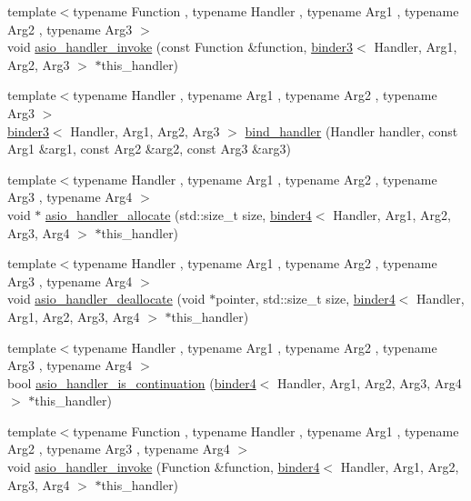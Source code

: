 \begin{DoxyCompactItemize}
{\footnotesize template$<$typename Function , typename Handler , typename Arg1 , typename Arg2 , typename Arg3 $>$ }\\void \hyperlink{namespaceasio_1_1detail_ad9a14513de8c2042994bf4a2a490c66a}{asio\+\_\+handler\+\_\+invoke} (const Function \&function, \hyperlink{classasio_1_1detail_1_1binder3}{binder3}$<$ Handler, Arg1, Arg2, Arg3 $>$ $\ast$this\+\_\+handler)
\item 
{\footnotesize template$<$typename Handler , typename Arg1 , typename Arg2 , typename Arg3 $>$ }\\\hyperlink{classasio_1_1detail_1_1binder3}{binder3}$<$ Handler, Arg1, Arg2, Arg3 $>$ \hyperlink{namespaceasio_1_1detail_a5b52e5454e451120433659f0e84565f6}{bind\+\_\+handler} (Handler handler, const Arg1 \&arg1, const Arg2 \&arg2, const Arg3 \&arg3)
\item 
{\footnotesize template$<$typename Handler , typename Arg1 , typename Arg2 , typename Arg3 , typename Arg4 $>$ }\\void $\ast$ \hyperlink{namespaceasio_1_1detail_abb11faf8dbffe103f5c5d35f88a9c71d}{asio\+\_\+handler\+\_\+allocate} (std\+::size\+\_\+t size, \hyperlink{classasio_1_1detail_1_1binder4}{binder4}$<$ Handler, Arg1, Arg2, Arg3, Arg4 $>$ $\ast$this\+\_\+handler)
\item 
{\footnotesize template$<$typename Handler , typename Arg1 , typename Arg2 , typename Arg3 , typename Arg4 $>$ }\\void \hyperlink{namespaceasio_1_1detail_a1b7304d597d2938a9bf367fef4b33668}{asio\+\_\+handler\+\_\+deallocate} (void $\ast$pointer, std\+::size\+\_\+t size, \hyperlink{classasio_1_1detail_1_1binder4}{binder4}$<$ Handler, Arg1, Arg2, Arg3, Arg4 $>$ $\ast$this\+\_\+handler)
\item 
{\footnotesize template$<$typename Handler , typename Arg1 , typename Arg2 , typename Arg3 , typename Arg4 $>$ }\\bool \hyperlink{namespaceasio_1_1detail_a6348366696b56596e5c5c79abf77f31a}{asio\+\_\+handler\+\_\+is\+\_\+continuation} (\hyperlink{classasio_1_1detail_1_1binder4}{binder4}$<$ Handler, Arg1, Arg2, Arg3, Arg4 $>$ $\ast$this\+\_\+handler)
\item 
{\footnotesize template$<$typename Function , typename Handler , typename Arg1 , typename Arg2 , typename Arg3 , typename Arg4 $>$ }\\void \hyperlink{namespaceasio_1_1detail_a4dd3c51c4fe856f200f60492fd4c875c}{asio\+\_\+handler\+\_\+invoke} (Function \&function, \hyperlink{classasio_1_1detail_1_1binder4}{binder4}$<$ Handler, Arg1, Arg2, Arg3, Arg4 $>$ $\ast$this\+\_\+handler)

\end{DoxyCompactItemize}
